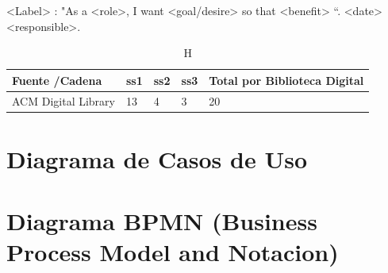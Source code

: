 \documentclass{report}
\begin{document}
<Label> :
"As a <role>, I
want <goal/desire> so
that <benefit> “.
<date>
<responsible>.    
    
    \begin{table}
        \begin{center}
            \caption{H}
            \label{table:ResultsSearchStringOutStandingStudies}
            \begin{tabular}{| p{6cm} | p{1cm} | p{1cm} | p{1cm} | p{4cm} |}
                \toprule
                \hline
                \textbf{Fuente /Cadena} & \textbf{ss1} & \textbf{ss2} & \textbf{ss3} & \textbf{Total por Biblioteca Digital}\\ \hline
                ACM Digital Library & 13 & 4 & 3 & 20 \\ \hline
            \end{tabular}
        \end{center}
    \end{table}
    
    \section{Diagrama de Casos de Uso}
    
    \begin{figure}
		\centering
	\end{figure}    
    
    
    \section{Diagrama BPMN (Business Process Model and Notacion)}
    
\end{document}
